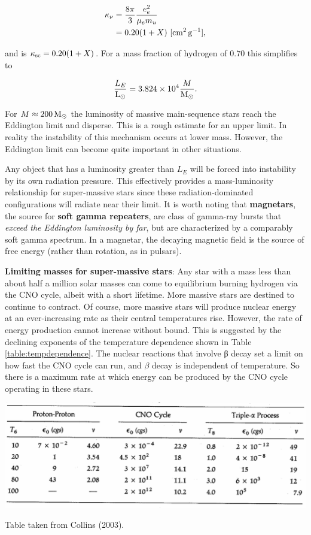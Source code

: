 \documentclass[a4paper,10pt]{article}
\begin{document}
\begin{align*}
    \kappa_\nu &= \frac{8\pi}{3} \frac{e_e^2}{\mu_em_u} \\
    &= 0.20(1+X) ~ [{\rm cm^2\,g^{-1}}],
\end{align*}

and is $\kappa_{\rm sc}=0.20(1+X)$. For a mass fraction of hydrogen of $0.70$ this simplifies to

\begin{align*}
    \frac{L_E}{{\rm L_\odot}} = 3.824\times10^4\frac{M}{{\rm M_\odot}}.
\end{align*}

{\noindent}For $M\approx200\,{\rm M_\odot}$ the luminosity of massive main-sequence stars reach the Eddington limit and disperse. This is a rough estimate for an upper limit. In reality the instability of this mechanism occurs at lower mass. However, the Eddington limit can become quite important in other situations.

{\noindent}Any object that has a luminosity greater than $L_E$ will be forced into instability by its own radiation pressure. This effectively provides a mass-luminosity relationship for super-massive stars since these radiation-dominated configurations will radiate near their limit. It is worth noting that \textbf{magnetars}, the source for \textbf{soft gamma repeaters}, are class of gamma-ray bursts that \textit{exceed the Eddington luminosity by far}, but are characterized by a comparably soft gamma spectrum. In a magnetar, the decaying magnetic field is the source of free energy (rather than rotation, as in pulsars).

{\noindent}\textbf{Limiting masses for super-massive stars}: Any star with a mass less than about half a million solar masses can come to equilibrium burning hydrogen via the CNO cycle, albeit with a short lifetime. More massive stars are destined to continue to contract. Of course, more massive stars will produce nuclear energy at an ever-increasing rate as their central temperatures rise. However, the rate of energy production cannot increase without bound. This is suggested by the declining exponents of the temperature dependence shown in Table \ref{table:tempdependence}. The nuclear reactions that involve β decay set a limit on how fast the CNO cycle can run, and $\beta$ decay is independent of temperature. So there is a maximum rate at which energy can be produced by the CNO cycle operating in these stars.

\begin{table}[h]
    \centering
    \includegraphics[width=14cm]{figures/TempDependence.png}
    \caption{\footnotesize{Table taken from Collins (2003).}}
    \label{table:tempdependence}
\end{table}
\end{document}
